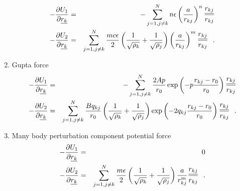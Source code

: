 \begin{enumerate}
\begin{eqnarray}
-\frac{\partial U_{1}}{\partial \mbox{$\underline{r_{k}}$}} &=& -\sum_{j=1,j \ne k}^{N} n \epsilon
\left( \frac{a}{r_{kj}} \right)^{n} \frac{\mbox{$\underline{r_{kj}}$}}{r_{kj}} \nonumber \\
-\frac{\partial U_{2}}{\partial \mbox{$\underline{r_{k}}$}} &=& \sum_{j=1,j \ne k}^{N} \frac{m c \epsilon}{2}
\left( {1 \over \sqrt{\rho_{k}}} + {1 \over \sqrt{\rho_{j}}} \right)
\left( \frac{a}{r_{kj}} \right)^{m} \frac{\mbox{$\underline{r_{kj}}$}}{r_{kj}}~~.
\end{eqnarray}
\item Gupta force
\begin{eqnarray}
-\frac{\partial U_{1}}{\partial \mbox{$\underline{r_{k}}$}} &=& -\sum_{j=1,j \ne k}^{N} \frac{2 A p}{r_{0}}
\exp \left( -p \frac{r_{kj}-r_{0}}{r_{0}} \right) \frac{\mbox{$\underline{r_{kj}}$}}{r_{kj}} \nonumber \\
-\frac{\partial U_{2}}{\partial \mbox{$\underline{r_{k}}$}} &=& \sum_{j=1,j \ne k}^{N} \frac{B q_{kj}}{r_{0}}
\left( {1 \over \sqrt{\rho_{k}}} + {1 \over \sqrt{\rho_{j}}} \right)
\exp \left( -2 q_{kj} \frac{r_{kj}-r_{0}}{r_{0}} \right) \frac{\mbox{$\underline{r_{kj}}$}}{r_{kj}}~~.
\end{eqnarray}
\item Many body perturbation component potential force
\begin{eqnarray}
-\frac{\partial U_{1}}{\partial \mbox{$\underline{r_{k}}$}} &=& 0 \nonumber \\
-\frac{\partial U_{2}}{\partial \mbox{$\underline{r_{k}}$}} &=& \sum_{j=1,j \ne k}^{N} \frac{m \epsilon}{2}
\left( {1 \over \sqrt{\rho_{k}}} + {1 \over \sqrt{\rho_{j}}} \right)
\frac{a}{r_{kj}^{m}} \frac{\mbox{$\underline{r_{kj}}$}}{r_{kj}}~~.
\end{eqnarray}
\end{enumerate}

